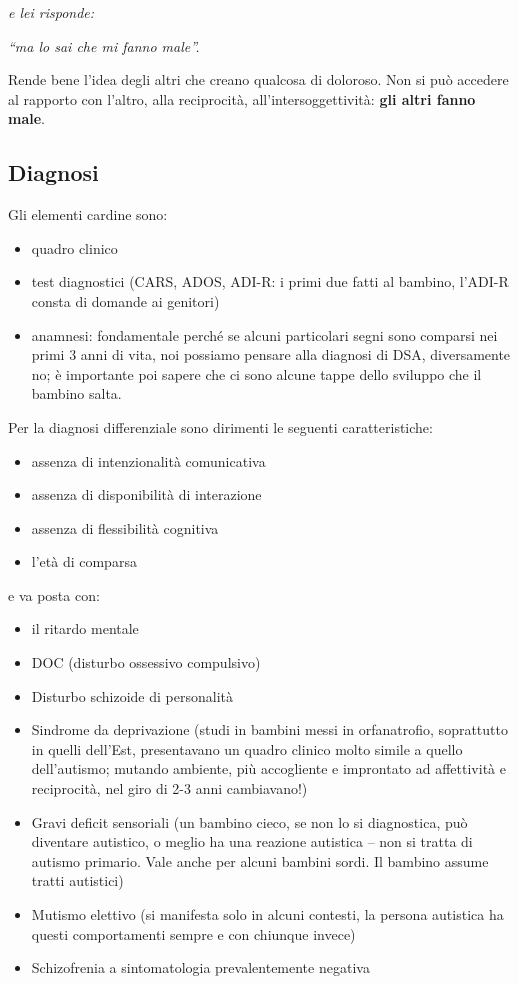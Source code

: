 \emph{e lei risponde: }

\emph{``ma lo sai che mi fanno male''.}

Rende bene l'idea degli altri che creano qualcosa di doloroso. Non si
può accedere al rapporto con l'altro, alla reciprocità,
all'intersoggettività: \textbf{gli altri fanno male}.

\subsection{Diagnosi}

Gli elementi cardine sono:

\begin{itemize}
\item
  quadro clinico
\item
  test diagnostici (CARS, ADOS, ADI-R: i primi due fatti al bambino,
  l'ADI-R consta di domande ai genitori)
\item
  anamnesi: fondamentale perché se alcuni particolari segni sono
  comparsi nei primi 3 anni di vita, noi possiamo pensare alla diagnosi
  di DSA, diversamente no; è importante poi sapere che ci sono alcune
  tappe dello sviluppo che il bambino salta.
\end{itemize}

Per la diagnosi differenziale sono dirimenti le seguenti
caratteristiche:

\begin{itemize}
\item
  assenza di intenzionalità comunicativa
\item
  assenza di disponibilità di interazione
\item
  assenza di flessibilità cognitiva
\item
  l'età di comparsa
\end{itemize}

e va posta con:

\begin{itemize}
\item
  il ritardo mentale
\item
  DOC (disturbo ossessivo compulsivo)
\item
  Disturbo schizoide di personalità
\item
  Sindrome da deprivazione (studi in bambini messi in orfanatrofio,
  soprattutto in quelli dell'Est, presentavano un quadro clinico molto
  simile a quello dell'autismo; mutando ambiente, più accogliente e
  improntato ad affettività e reciprocità, nel giro di 2-3 anni
  cambiavano!)
\item
  Gravi deficit sensoriali (un bambino cieco, se non lo si diagnostica,
  può diventare autistico, o meglio ha una reazione autistica -- non si
  tratta di autismo primario. Vale anche per alcuni bambini sordi. Il
  bambino assume tratti autistici)
\item
  Mutismo elettivo (si manifesta solo in alcuni contesti, la persona
  autistica ha questi comportamenti sempre e con chiunque invece)
\item
  Schizofrenia a sintomatologia prevalentemente negativa
\end{itemize}

